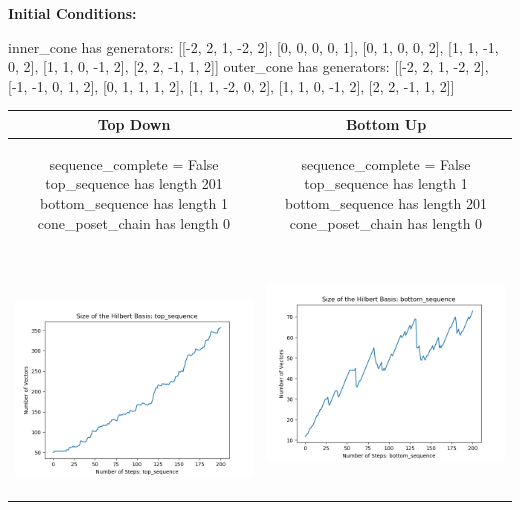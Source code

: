 \documentclass[10pt]{article}
\begin{document}
\textbf{Initial Conditions:}
\begin{SAGE}
inner_cone has generators: 
[[-2, 2, 1, -2, 2], [0, 0, 0, 0, 1], [0, 1, 0, 0, 2], [1, 1, -1, 0, 2], [1, 1, 0, -1, 2], [2, 2, -1, 1, 2]]
outer_cone has generators: 
[[-2, 2, 1, -2, 2], [-1, -1, 0, 1, 2], [0, 1, 1, 1, 2], [1, 1, -2, 0, 2], [1, 1, 0, -1, 2], [2, 2, -1, 1, 2]]

\end{SAGE}
\begin{tabular}{c|c}
\textbf{Top Down} & \textbf{Bottom Up} \\ \hline  
\begin{SAGE}
	sequence_complete = False
	top_sequence has length 201
	bottom_sequence has length 1
	cone_poset_chain has length 0
\end{SAGE} 
&
\begin{SAGE}
	sequence_complete = False
	top_sequence has length 1
	bottom_sequence has length 201
	cone_poset_chain has length 0
\end{SAGE} 
\\ \hline
\
\begin{minipage}{.45\textwidth}
\includegraphics[width=\textwidth]{"DATA/5d/6 generators 2 bound I/top_sequence SIZE"}
\end{minipage} &
\begin{minipage}{.45\textwidth}
\includegraphics[width=\textwidth]{"DATA/5d/6 generators 2 bound I bottomup/bottom_sequence SIZE"}

\end{minipage}
\end{tabular}
\end{document}
